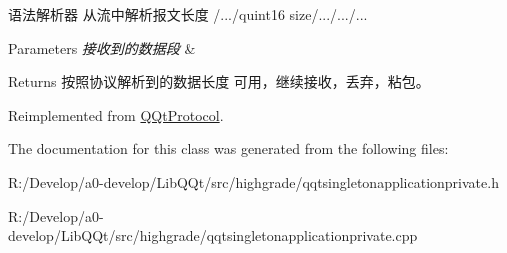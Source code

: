 语法解析器 从流中解析报文长度 /.../quint16 size/.../.../... 


\begin{DoxyParams}{Parameters}
{\em 接收到的数据段} & \\
\hline
\end{DoxyParams}
\begin{DoxyReturn}{Returns}
按照协议解析到的数据长度 可用，继续接收，丢弃，粘包。 
\end{DoxyReturn}


Reimplemented from \mbox{\hyperlink{class_q_qt_protocol_a00fd0c1ac23379ed3b9b25da9a34f39b}{Q\+Qt\+Protocol}}.



The documentation for this class was generated from the following files\+:\begin{DoxyCompactItemize}
\item 
R\+:/\+Develop/a0-\/develop/\+Lib\+Q\+Qt/src/highgrade/qqtsingletonapplicationprivate.\+h\item 
R\+:/\+Develop/a0-\/develop/\+Lib\+Q\+Qt/src/highgrade/qqtsingletonapplicationprivate.\+cpp\end{DoxyCompactItemize}
